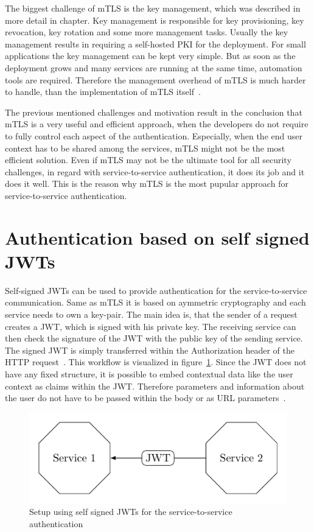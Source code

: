 The biggest challenge of mTLS is the key management, which was described in more detail in chapter.
Key management is responsible for key provisioning, key revocation, key rotation and some more management tasks.
Usually the key management results in requiring a self-hosted PKI for the deployment.
For small applications the key management can be kept very simple.
But as soon as the deployment grows and many services are running at the same time, automation tools are required.
Therefore the management overhead of mTLS is much harder to handle, than the implementation of mTLS itself~\cite{dias2020microservices}.

The previous mentioned challenges and motivation result in the conclusion that mTLS is a very useful and efficient approach, when the developers do not require to fully control each aspect of the authentication.
Especially, when the end user context has to be shared among the services, mTLS might not be the most efficient solution.
Even if mTLS may not be the ultimate tool for all security challenges, in regard with service-to-service authentication, it does its job and it does it well.
This is the reason why mTLS is the most pupular approach for service-to-service authentication.

\section{Authentication based on self signed JWTs}
Self-signed JWTs can be used to provide authentication for the service-to-service communication.
Same as mTLS it is based on aymmetric cryptography and each service needs to own a key-pair.
The main idea is, that the sender of a request creates a JWT, which is signed with his private key.
The receiving service can then check the signature of the JWT with the public key of the sending service.
The signed JWT is simply transferred within the Authorization header of the HTTP request~\cite{dias2020microservices}.
This workflow is visualized in figure~\ref{fig:auth_mechanisms_jwt}.
Since the JWT does not have any fixed structure, it is possible to embed contextual data like the user context as claims within the JWT.
Therefore parameters and information about the user do not have to be passed within the body or as URL parameters~\cite{dias2020microservices}.

\begin{figure}
	\centering
	\includegraphics{images/authentication-mechanisms/TikZ_jwt_base_structure.pdf}
	\caption{Setup using self signed JWTs for the service-to-service authentication~\cite{dias2020microservices}}
	\label{fig:auth_mechanisms_jwt}
\end{figure}

